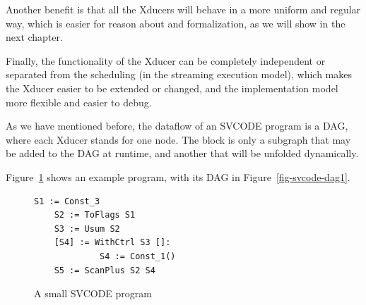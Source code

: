 Another benefit is that all the Xducers will behave in a more uniform and regular way, which is easier for reason about and formalization, as we will show in the next chapter.

Finally, the functionality of the Xducer can be completely independent or separated from the scheduling (in the streaming execution model),  which makes the Xducer easier to be extended or changed,
and the implementation model more flexible and easier to debug. 


As we have mentioned before, the dataflow of an SVCODE program is a DAG, where each Xducer stands for one node. 
The \wc block is only a subgraph that may be added to the DAG at runtime,  
and \sc another that will be unfolded dynamically.

Figure~\ref{fig-svcode-eg1} shows an example program, with its DAG in Figure~\ref{fig-svcode-dag1}. \\

\begin{figure}[H]
	\begin{lstlisting}[style=svcode-style]
	S1 := Const_3
	S2 := ToFlags S1
	S3 := Usum S2
	[S4] := WithCtrl S3 []:
	         S4 := Const_1()
	S5 := ScanPlus S2 S4
	\end{lstlisting}	
	\caption{A small SVCODE program \label{fig-svcode-eg1}}
\end{figure}
\hspace{1cm}



